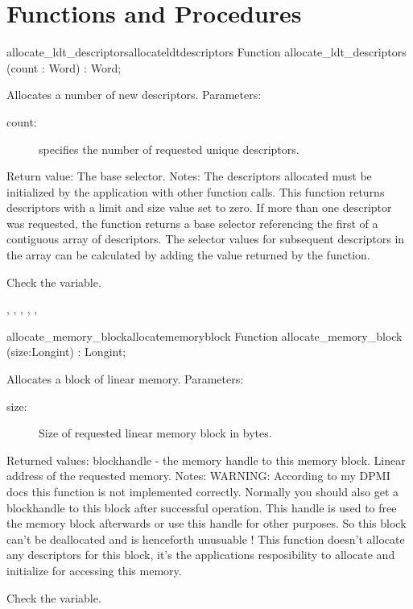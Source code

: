 \section{Functions and Procedures}
\begin{functionl}{allocate\_ldt\_descriptors}{allocateldtdescriptors}
\Declaration
Function allocate\_ldt\_descriptors (count : Word) : Word;

\Description
Allocates a number of new descriptors.
Parameters: 
\begin{description}
\item[count:\ ] specifies the number of requested unique descriptors.
\end{description}
Return value: The base selector.
Notes: The descriptors allocated must be initialized by the application with
other function calls. This function returns descriptors with a limit and
size value set to zero. If more than one descriptor was requested, the
function returns a base selector referencing the first of a contiguous array
of descriptors. The selector values for subsequent descriptors in the array
can be calculated by adding the value returned by the
function.

\Errors
 Check the  variable. 
\SeeAlso

,
,
,
,
,

\end{functionl}
\html{}
\begin{functionl}{allocate\_memory\_block}{allocatememoryblock}
\Declaration
Function allocate\_memory\_block (size:Longint) : Longint;

\Description
Allocates a block of linear memory.
Parameters: 
\begin{description}
\item[size:\ ] Size of requested linear memory block in bytes.
\end{description}
Returned values: blockhandle - the memory handle to this memory block. Linear
address of the requested memory.
Notes: WARNING: According to my DPMI docs this function is not implemented
correctly. Normally you should also get a blockhandle to this block after
successful operation. This handle is used to free the memory block
afterwards or use this handle for other purposes. So this block can't be
deallocated and is henceforth unusuable !
This function doesn't allocate any descriptors for this block, it's the
applications resposibility to allocate and initialize for accessing this
memory.

\Errors
 Check the  variable.
\SeeAlso
\end{functionl}
